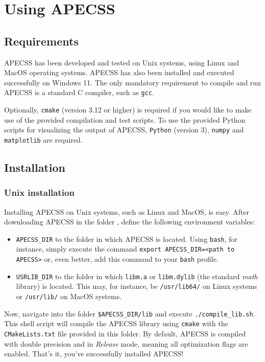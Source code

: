 \chapter{Using APECSS}

\section{Requirements}

APECSS has been developed and tested on Unix systems, using Linux and MacOS operating systems. APECSS has also been installed and executed successfully on Windows 11. The only mandatory requirement to compile and run APECSS is a standard C compiler, such as {\tt gcc}.

Optionally, {\tt cmake} (version 3.12 or higher) is required if you would like to make use of the provided compilation and test scripts. To use the provided Python scripts for visualizing the output of APECSS, {\tt Python} (version 3), {\tt numpy} and {\tt matplotlib} are required.

\section{Installation}
\label{sec:installation}

\subsection{Unix installation}
\label{sec:installation_unix}

Installing APECSS on Unix systems, such as Linux and MacOS, is easy. After downloading APECSS in the folder {\tt <path to APECSS>}, define the following environment variables:\vspace{-1em}
\begin{itemize}[noitemsep]
\item {\tt APECSS\_DIR} to the folder in which APECSS is located. Using {\tt bash}, for instance, simply execute the command {\tt export APECSS\_DIR=<path to APECSS>} or, even better, add this command to your {\tt bash} profile.
\item {\tt USRLIB\_DIR} to the folder in which {\tt libm.a} or {\tt libm.dylib} (the standard \textit{math} library) is located. This may, for instance, be {\tt /usr/lib64/} on Linux systems or {\tt /usr/lib/} on MacOS systems.
\end{itemize}

Now, navigate into the folder {\tt \$APECSS\_DIR/lib} and execute {\tt ./compile\_lib.sh}. This shell script will compile the APECSS library using {\tt cmake} with the {\tt CMakeLists.txt} file provided in this folder. By default, APECSS is compiled with double precision and in \textit{Release} mode, meaning all optimization flags are enabled. That's it, you've successfully installed APECSS!

